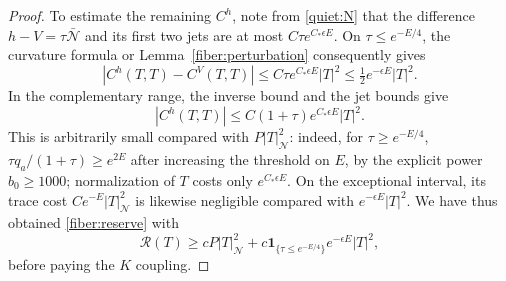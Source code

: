 \begin{proof}
To estimate the remaining \(C^h\), note from \eqref{quiet:N} that
the difference \(h-V=\tau\bar{\mathcal N}\) and its first two jets
are at most \(C\tau e^{C_*\epsilon E}\).
On \(\tau\le e^{-E/4}\), the curvature formula or
Lemma~\ref{fiber:perturbation} consequently gives
\[
 |C^h(T,T)-C^V(T,T)|
       \le C\tau e^{C_*\epsilon E}|T|^2
       \le\tfrac12e^{-\epsilon E}|T|^2.
\]
In the complementary range, the inverse bound and the jet bounds give
\[
 |C^h(T,T)|\le C(1+\tau)e^{C_*\epsilon E}|T|^2.
\]
This is arbitrarily small compared with \(P|T|_{\mathcal N}^2\):
indeed, for \(\tau\ge e^{-E/4}\),
\(\tau q_a/(1+\tau)\ge e^{2E}\) after increasing the threshold on \(E\),
by the explicit power \(b_0\ge1000\); normalization of \(T\) costs only
\(e^{C_*\epsilon E}\).  On the exceptional interval, its trace cost
\(Ce^{-E}|T|_{\mathcal N}^2\) is likewise negligible compared with
\(e^{-\epsilon E}|T|^2\).
We have thus obtained \eqref{fiber:reserve} with
\begin{equation}\label{quiet:Rreserve}
 \mathcal R(T)\ge cP|T|_{\mathcal N}^2
  +c\boldsymbol{1}_{\{\tau\le e^{-E/4}\}}
                          e^{-\epsilon E}|T|^2,
\end{equation}
before paying the \(K\) coupling.


\end{proof}
